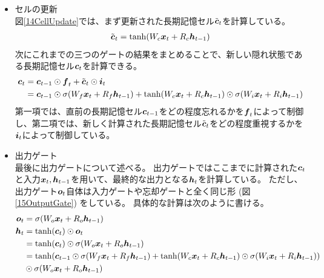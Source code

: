 \begin{itemize}
  \item セルの更新\\
  図\ref{14CellUpdate}では、まず更新された長期記憶セル$\tilde{{\mbox{\boldmath{$c$}}}}_t$を計算している。
\begin{equation}
 \begin{split}
  \tilde{{\mbox{\boldmath{$c$}}}}_t = \tanh (W_c {\mbox{\boldmath{$x$}}}_t + R_c {\mbox{\boldmath{$h$}}}_{t-1})
 \end{split}
\end{equation} 
  次にこれまでの三つのゲートの結果をまとめることで、新しい隠れ状態である長期記憶セル${\mbox{\boldmath{$c$}}}_{t}$を計算できる。
\begin{equation}
 \begin{split}
  {\mbox{\boldmath{$c$}}}_{t} 
  &= {\mbox{\boldmath{$c$}}}_{t-1} \odot {\mbox{\boldmath{$f$}}}_{t} + \tilde{\mbox{\boldmath{$c$}}}_{t}\odot{\mbox{\boldmath{$i$}}}_{t}\\
  &= {\mbox{\boldmath{$c$}}}_{t-1} \odot \sigma (W_f {\mbox{\boldmath{$x$}}}_t + R_f {\mbox{\boldmath{$h$}}}_{t-1}) 
  + \tanh (W_c {\mbox{\boldmath{$x$}}}_t + R_c {\mbox{\boldmath{$h$}}}_{t-1}) \odot \sigma (W_i {\mbox{\boldmath{$x$}}}_t + R_i {\mbox{\boldmath{$h$}}}_{t-1})
 \end{split}
\end{equation}
  第一項では、直前の長期記憶セル${\mbox{\boldmath{$c$}}}_{t-1}$をどの程度忘れるかを${\mbox{\boldmath{$f$}}}_{t}$によって制御し、第二項では、新しく計算された長期記憶セル$\tilde{\mbox{\boldmath{$c$}}}_{t}$をどの程度重視するかを${\mbox{\boldmath{$i$}}}_{t}$によって制御している。
    
  \item 出力ゲート\\
  最後に出力ゲートについて述べる。
  出力ゲートではここまでに計算された${\mbox{\boldmath{$c$}}}_{t}$と入力${\mbox{\boldmath{$x$}}}_t, {\mbox{\boldmath{$h$}}}_{t-1}$を用いて、最終的な出力となる${\mbox{\boldmath{$h$}}}_{t}$を計算している。
  ただし、出力ゲート${\mbox{\boldmath{$o$}}}_{t}$自体は入力ゲートや忘却ゲートと全く同じ形 (図\ref{15OutputGate}) をしている。
  具体的な計算は次のように書ける。
\begin{equation}
 \begin{split}
  {\mbox{\boldmath{$o$}}}_{t} 
  &= \sigma (W_o {\mbox{\boldmath{$x$}}}_t + R_o {\mbox{\boldmath{$h$}}}_{t-1})\\
  {\mbox{\boldmath{$h$}}}_{t} 
  &= \tanh({\mbox{\boldmath{$c$}}}_{t}) \odot {\mbox{\boldmath{$o$}}}_{t}\\
  &= \tanh({\mbox{\boldmath{$c$}}}_{t}) \odot \sigma (W_o {\mbox{\boldmath{$x$}}}_t + R_o {\mbox{\boldmath{$h$}}}_{t-1})\\
  &= \tanh({\mbox{\boldmath{$c$}}}_{t-1} \odot \sigma (W_f {\mbox{\boldmath{$x$}}}_t + R_f {\mbox{\boldmath{$h$}}}_{t-1}) 
  + \tanh (W_c {\mbox{\boldmath{$x$}}}_t + R_c {\mbox{\boldmath{$h$}}}_{t-1}) \odot \sigma (W_i {\mbox{\boldmath{$x$}}}_t + R_i {\mbox{\boldmath{$h$}}}_{t-1})) \\
  &\odot \sigma (W_o {\mbox{\boldmath{$x$}}}_t + R_o {\mbox{\boldmath{$h$}}}_{t-1})
 \end{split}
\end{equation}
\end{itemize}

